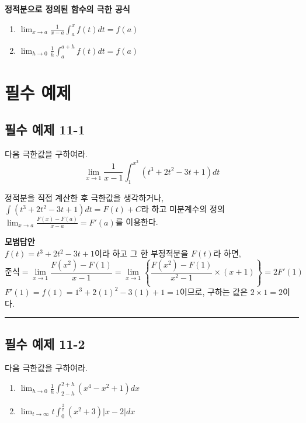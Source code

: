 \documentclass[a4paper,11pt]{article}
\begin{document}
\begin{advicebox}
\textbf{정적분으로 정의된 함수의 극한 공식} \\
\begin{enumerate}
    \item $\displaystyle \lim_{x \to a} \frac{1}{x-a} \int_{a}^{x} f(t) dt = f(a)$
    \item $\displaystyle \lim_{h \to 0} \frac{1}{h} \int_{a}^{a+h} f(t) dt = f(a)$
\end{enumerate}
\end{advicebox}

\newpage

\section*{필수 예제}

\subsection*{필수 예제 11-1}
다음 극한값을 구하여라. 
\[ \lim_{x \to 1} \frac{1}{x-1} \int_{1}^{x^{2}} (t^{3} + 2t^{2} - 3t + 1) dt \]

\begin{studybox} 
정적분을 직접 계산한 후 극한값을 생각하거나, $\int (t^{3} + 2t^{2} - 3t + 1) dt = F(t) + C$라 하고 미분계수의 정의 $\lim_{x \to a} \frac{F(x)-F(a)}{x-a} = F'(a)$를 이용한다.
\end{studybox}

\textbf{모범답안} \\
$f(t) = t^{3} + 2t^{2} - 3t + 1$이라 하고 그 한 부정적분을 $F(t)$라 하면,
\[ \text{준식} = \lim_{x \to 1} \frac{F(x^{2}) - F(1)}{x-1} = \lim_{x \to 1} \left\{ \frac{F(x^{2}) - F(1)}{x^{2}-1} \times (x+1) \right\} = 2 F'(1) \]
$F'(1) = f(1) = 1^{3} + 2(1)^{2} - 3(1) + 1 = 1$이므로, 구하는 값은 $2 \times 1 = 2$이다.

\vspace{0.5cm}
\hrule
\vspace{0.5cm}

\subsection*{필수 예제 11-2}
다음 극한값을 구하여라. 
\begin{enumerate}
    \item $\displaystyle \lim_{h \to 0} \frac{1}{h} \int_{2-h}^{2+h} (x^{4} - x^{2} + 1) dx$ 
    \item $\displaystyle \lim_{t \to \infty} t \int_{0}^{\frac{2}{t}} (x^{2} + 3)|x-2| dx$ 
\end{enumerate}
\end{document}
